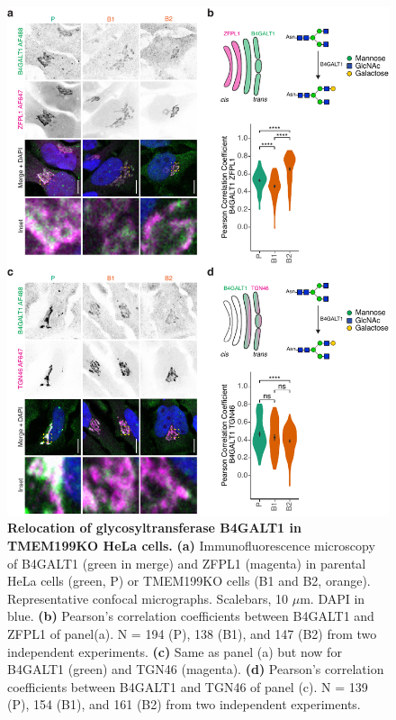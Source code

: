 \begin{figure}
    \includegraphics[keepaspectratio=true,width=\textwidth,height=\textheight]{chapters/chapter4/chapter4_SupplementaryFigure2.pdf}
    \caption{\textbf{Relocation of glycosyltransferase B4GALT1 in TMEM199KO HeLa cells.} \textbf{(a)} Immunofluorescence microscopy of B4GALT1 (green in merge) and ZFPL1 (magenta) in parental HeLa cells (green, P) or TMEM199KO cells (B1 and B2, orange). Representative confocal micrographs. Scalebars, 10 $\mu$m. DAPI in blue. \textbf{(b)} Pearson’s correlation coefficients between B4GALT1 and ZFPL1 of panel(a). N = 194 (P), 138 (B1), and 147 (B2) from two independent experiments. \textbf{(c)} Same as panel (a) but now for B4GALT1 (green) and TGN46 (magenta). \textbf{(d)} Pearson’s correlation coefficients between B4GALT1 and TGN46 of panel (c). N = 139 (P), 154 (B1), and 161 (B2) from two independent experiments.}
    \label{fig:ch4supfig2}
\end{figure}

